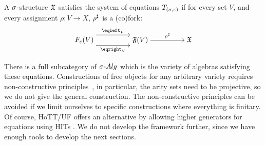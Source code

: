 \begin{definition}
    A $\sigma$-structure $\mathfrak{X}$ satisfies the system of equations $T_{(\sigma,\varepsilon)}$ if for every set $V$,
    and every assignment $\rho : V \to X$, ${\rho}^{\sharp}$ is a (co)fork:
    \[\begin{tikzcd}[ampersand replacement=\&,cramped]
            {\EqSig(V)} \&\& {\str{F}(V)} \&\& {\str{X}}
            \arrow["{\ext{\rho}}", from=1-3, to=1-5]
            \arrow["{\eqleft_{V}}", shift left=3, from=1-1, to=1-3]
            \arrow["{\eqright_{V}}"', shift right=3, from=1-1, to=1-3]
        \end{tikzcd}\]
\end{definition}

There is a full subcategory of $\sigAlg$ which is the variety of algebras satisfying these equations.
%
Constructions of free objects for any arbitrary variety requires non-constructive
principles~\cite[\S~7, pg.142]{blassWordsFreeAlgebras1983},
in particular, the arity sets need to be projective, so we do not give the general construction.
%
The non-constructive principles can be avoided if we limit ourselves to specific constructions
where everything is finitary.
%
Of course, HoTT/UF offers an alternative by allowing higher generators for equations using HITs
\cite{univalentfoundationsprogramHomotopyTypeTheory2013}.
%
We do not develop the framework further, since we have enough tools to develop the next sections.
